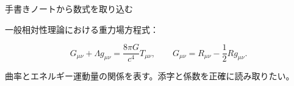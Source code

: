\documentclass[a4paper,14pt]{ltjsarticle}
\begin{document}
\begin{center}
  {\Large 手書きノートから数式を取り込む}\par
\end{center}

\vspace{14mm}

一般相対性理論における重力場方程式：

\vspace{8mm}

\[
G_{\mu\nu}+\Lambda g_{\mu\nu}
=\frac{8\pi G}{c^4}T_{\mu\nu},
\qquad
G_{\mu\nu}=R_{\mu\nu}-\frac{1}{2}Rg_{\mu\nu}.
\]

\vspace{8mm}

曲率とエネルギー運動量の関係を表す。添字と係数を正確に読み取りたい。
\end{document}
